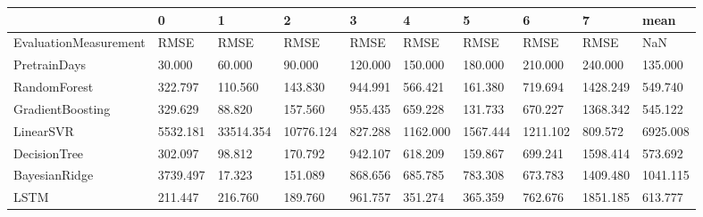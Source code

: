 \begin{tabular}{llllllllll}
\toprule
{} &        0 &         1 &         2 &       3 &        4 &        5 &        6 &        7 &     mean \\
\midrule
EvaluationMeasurement &     RMSE &      RMSE &      RMSE &    RMSE &     RMSE &     RMSE &     RMSE &     RMSE &      NaN \\
PretrainDays          &   30.000 &    60.000 &    90.000 & 120.000 &  150.000 &  180.000 &  210.000 &  240.000 &  135.000 \\
RandomForest          &  322.797 &   110.560 &   143.830 & 944.991 &  566.421 &  161.380 &  719.694 & 1428.249 &  549.740 \\
GradientBoosting      &  329.629 &    88.820 &   157.560 & 955.435 &  659.228 &  131.733 &  670.227 & 1368.342 &  545.122 \\
LinearSVR             & 5532.181 & 33514.354 & 10776.124 & 827.288 & 1162.000 & 1567.444 & 1211.102 &  809.572 & 6925.008 \\
DecisionTree          &  302.097 &    98.812 &   170.792 & 942.107 &  618.209 &  159.867 &  699.241 & 1598.414 &  573.692 \\
BayesianRidge         & 3739.497 &    17.323 &   151.089 & 868.656 &  685.785 &  783.308 &  673.783 & 1409.480 & 1041.115 \\
LSTM                  &  211.447 &   216.760 &   189.760 & 961.757 &  351.274 &  365.359 &  762.676 & 1851.185 &  613.777 \\
\bottomrule
\end{tabular}
